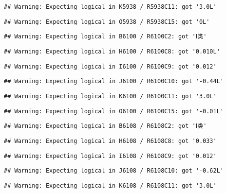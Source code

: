 \documentclass[
]{article}
\begin{document}
\begin{verbatim}
## Warning: Expecting logical in K5938 / R5938C11: got '3.0L'
\end{verbatim}

\begin{verbatim}
## Warning: Expecting logical in O5938 / R5938C15: got '0L'
\end{verbatim}

\begin{verbatim}
## Warning: Expecting logical in B6100 / R6100C2: got 'Ⅰ类'
\end{verbatim}

\begin{verbatim}
## Warning: Expecting logical in H6100 / R6100C8: got '0.010L'
\end{verbatim}

\begin{verbatim}
## Warning: Expecting logical in I6100 / R6100C9: got '0.012'
\end{verbatim}

\begin{verbatim}
## Warning: Expecting logical in J6100 / R6100C10: got '-0.44L'
\end{verbatim}

\begin{verbatim}
## Warning: Expecting logical in K6100 / R6100C11: got '3.0L'
\end{verbatim}

\begin{verbatim}
## Warning: Expecting logical in O6100 / R6100C15: got '-0.01L'
\end{verbatim}

\begin{verbatim}
## Warning: Expecting logical in B6108 / R6108C2: got 'Ⅰ类'
\end{verbatim}

\begin{verbatim}
## Warning: Expecting logical in H6108 / R6108C8: got '0.033'
\end{verbatim}

\begin{verbatim}
## Warning: Expecting logical in I6108 / R6108C9: got '0.012'
\end{verbatim}

\begin{verbatim}
## Warning: Expecting logical in J6108 / R6108C10: got '-0.62L'
\end{verbatim}

\begin{verbatim}
## Warning: Expecting logical in K6108 / R6108C11: got '3.0L'
\end{verbatim}
\end{document}
